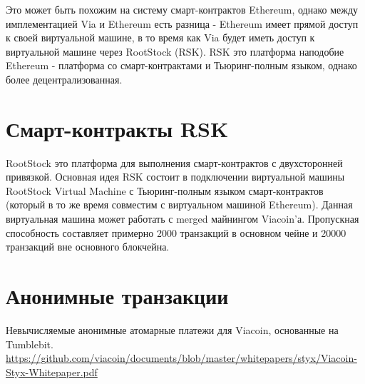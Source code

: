 \documentclass{article}
\begin{document}
\noindent
Это может быть похожим на систему смарт-контрактов Ethereum, однако между имплементацией Via и Ethereum есть разница - Ethereum имеет прямой доступ к своей виртуальной машине, в то время как Via будет иметь доступ к виртуальной машине через RootStock (RSK). RSK это платформа наподобие Ethereum - платформа со смарт-контрактами и Тьюринг-полным языком, однако более децентрализованная.

\section{Смарт-контракты RSK} \label{Viacoin RSK smart contracts}
\cite{rootstock}RootStock это платформа для выполнения смарт-контрактов с двухсторонней привязкой. Основная идея RSK состоит в подключении виртуальной машины RootStock Virtual Machine с Тьюринг-полным языком смарт-контрактов (который в то же время совместим с виртуальном машиной Ethereum). Данная виртуальная машина может работать с merged майнингом Viacoin'а. Пропускная способность составляет примерно 2000 транзакций в основном чейне и 20000 транзакций вне основного блокчейна.

\section{Анонимные транзакции} \label{Anonymous transactions}
\cite{styx}Невычисляемые анонимные атомарные платежи для Viacoin, основанные на Tumblebit. \newline
\url{https://github.com/viacoin/documents/blob/master/whitepapers/styx/Viacoin-Styx-Whitepaper.pdf}
\newpage
\printbibliography
\end{document}
